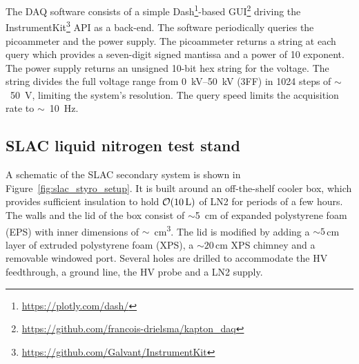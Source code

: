 \documentclass[a4paper,12pt]{article}
\begin{document}

The DAQ software consists of a simple Dash\footnote{\href{https://plotly.com/dash/}{https://plotly.com/dash/}}-based GUI\footnote{\href{https://github.com/francois-drielsma/kapton_daq}{https://github.com/francois-drielsma/kapton\_daq}} driving the InstrumentKit\footnote{\href{https://github.com/Galvant/InstrumentKit}{https://github.com/Galvant/InstrumentKit}} API as a back-end. 
The software periodically queries the picoammeter and the power supply. 
The picoammeter returns a string at each query which provides a seven-digit signed mantissa and a power of 10 exponent. 
The power supply returns an unsigned 10-bit hex string for the voltage. 
The string divides the full voltage range from \SIrange{0}{50}{\kilo\volt} (3FF) in 1024 steps of $\sim$~\SI{50}{\volt}, limiting the system's resolution. 
The query speed limits the acquisition rate to $\sim$~\SI{10}{\hertz}.

\subsection{SLAC liquid nitrogen test stand}

A schematic of the SLAC secondary system is shown in Figure~\ref{fig:slac_styro_setup}. 
It is built around an off-the-shelf cooler box, which provides sufficient insulation to hold $\order{\SI{10}{\liter}}$ of LN2 for periods of a few hours. 
The walls and the lid of the box consist of $\sim$\SI{5}{\centi\meter} of expanded polystyrene foam (EPS) with inner dimensions of $\sim$~\unit{\centi\metre\cubed}.
The lid is modified by adding a $\sim5$\,cm layer of extruded polystyrene foam (XPS), a $\sim20$\,cm XPS chimney and a removable windowed port. 
Several holes are drilled to accommodate the HV feedthrough, a ground line, the HV probe and a LN2 supply.
\end{document}
